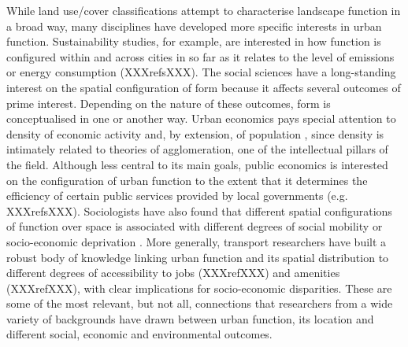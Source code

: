 While land use/cover classifications attempt to characterise landscape
function in a broad way, many disciplines have developed more specific
interests in urban function.
Sustainability studies, for example, are interested in how function is
configured within and across cities in so far as it relates to the level of
emissions \citep{angel2018shape} or energy consumption (XXXrefsXXX).
The social sciences have a long-standing interest on the spatial
configuration of form because it affects several outcomes of prime interest.
Depending on the nature of these outcomes, form is conceptualised in one or
another way.
Urban economics pays special attention to density of economic activity and, by
extension, of population \citep{ahlfeldt2019, duranton2020economics}, since
density is intimately related to theories of agglomeration, one of the
intellectual pillars of the field.
Although less central to its main goals, public economics is interested on the
configuration of urban function to the extent that it determines the
efficiency of certain public services provided by local governments (e.g.
XXXrefsXXX).
Sociologists have also found that different spatial configurations of function
over space is associated with different degrees of social mobility
\citep{ewing2016does} or socio-economic deprivation
\citep{venerandi2018scalable}.
More generally, transport researchers have built a robust body of knowledge
linking urban function and its spatial distribution to different degrees of
accessibility to jobs (XXXrefXXX) and amenities (XXXrefXXX), with clear
implications for socio-economic disparities.
These are some of the most relevant, but not all, connections that
researchers from a wide variety of backgrounds have drawn between urban
function, its location and different social, economic and environmental
outcomes.

